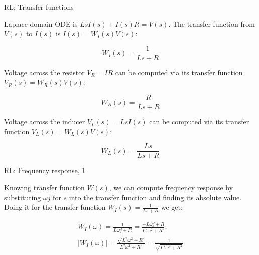 \documentclass{beamer}
\begin{document}
\begin{frame}{RL: Transfer functions}
	\begin{flushleft}
		
		Laplace domain ODE is $Ls I(s) + I(s)R = V(s)$. The transfer function from $V(s)$ to $I(s)$ is $I(s) = W_I(s)V(s)$:
		
		\begin{equation}
			W_I(s) = \frac{1}{Ls + R}
		\end{equation}
		
		Voltage across the resistor $V_R = IR$ can be computed via its transfer function $V_R(s) = W_R(s) V(s)$:
		
		\begin{equation}
			W_R(s) = \frac{R}{Ls + R}
		\end{equation}
	
		Voltage across the inducer $V_L(s) = Ls I(s)$ can be computed via its transfer function $V_L(s) = W_L(s) V(s)$:
	
		\begin{equation}
			W_L(s) = \frac{Ls}{Ls + R}
		\end{equation}

	\end{flushleft}
\end{frame}



\begin{frame}{RL: Frequency response, 1}
	\begin{flushleft}
		
		Knowing transfer function $W(s)$, we can compute frequency response by substituting $\omega j$ for $s$ into the transfer function and finding its absolute value. Doing it for the transfer function $W_I(s) = \frac{1}{Ls + R}$ we get:
		
		\begin{align}
			W_I(\omega) = \frac{1}{L\omega j + R} =
			 \frac{-L\omega j + R}{L^2\omega^2 + R^2}; \\
			|W_I(\omega)| = \frac{\sqrt{L^2\omega^2 + R^2}}{L^2\omega^2 + R^2} =
			\frac{1}{\sqrt{L^2\omega^2 + R^2}}
		\end{align}
		
	\end{flushleft}
\end{frame}
\end{document}

